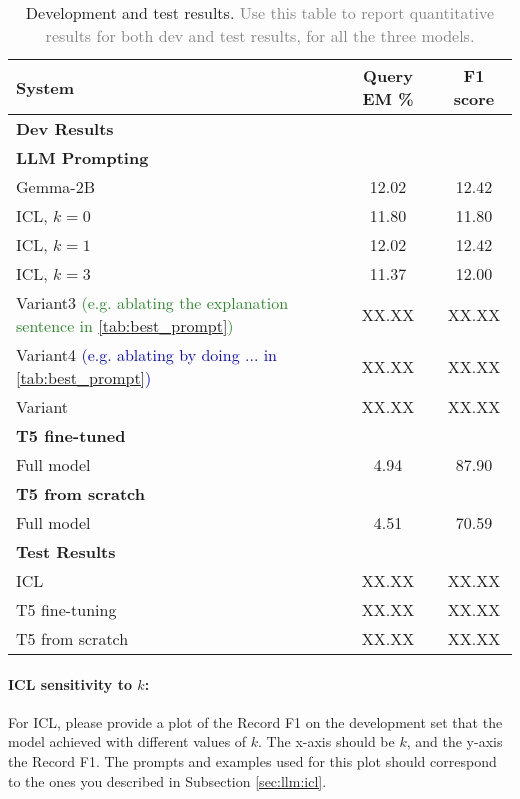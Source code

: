 \documentclass{article}
\begin{document}
\begin{table}[h!]
\centering
\begin{tabular}{lcc}
  \toprule
  System & Query EM \% & F1 score\\
  \midrule
  \multicolumn{3}{l}{\textbf{Dev Results}} \\
  \midrule
  \multicolumn{3}{l}{\textbf{LLM Prompting}} \\
  Gemma-2B & 12.02 & 12.42 \\ 
  ICL, $k=0$ & 11.80 & 11.80 \\
  ICL, $k=1$ & 12.02 & 12.42 \\
  ICL, $k=3$ & 11.37 & 12.00 \\
  Variant3 \textcolor{ForestGreen}{(e.g. ablating the explanation sentence in \autoref{tab:best_prompt})} & XX.XX & XX.XX \\
  Variant4 \textcolor{Blue}{(e.g. ablating by doing ... in \autoref{tab:best_prompt})} & XX.XX & XX.XX \\
  Variant & XX.XX & XX.XX \\[5pt]
  \multicolumn{3}{l}{\textbf{T5 fine-tuned}} \\
  Full model & 4.94 & 87.90 \\[5pt]
  \multicolumn{3}{l}{\textbf{T5 from scratch}} \\
  Full model & 4.51 & 70.59 \\ 
  \midrule
  \multicolumn{3}{l}{\textbf{Test Results}} \\
  \midrule
  ICL & XX.XX & XX.XX \\ 
  T5 fine-tuning & XX.XX & XX.XX \\
  T5 from scratch & XX.XX & XX.XX \\
  \bottomrule
\end{tabular}  
\caption{Development and test results. \textcolor{gray}{Use this table to report quantitative results for both dev and test results, for all the three models.}}
\label{tab:results}
\end{table}


\paragraph{ICL sensitivity to $k$:} For ICL, please provide a plot of the Record F1 on the development set that the model achieved with different values of $k$. The x-axis should be $k$, and the y-axis the Record F1. The prompts and examples used for this plot should correspond to the ones you described in Subsection \ref{sec:llm:icl}.
\end{document}
